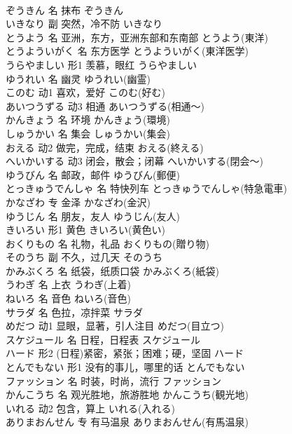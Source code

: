\documentclass[8pt]{extreport}
\begin{document}
\begin{CJK}{UTF8}{min}
\\	ぞうきん	名	抹布	ぞうきん	
\\	いきなり	副	突然，冷不防	いきなり	
\\	とうよう	名	亚洲，东方，亚洲东部和东南部	とうよう(東洋)	
\\	とうよういがく	名	东方医学	とうよういがく(東洋医学)	
\\	うらやましい	形1	羡慕，眼红	うらやましい	
\\	ゆうれい	名	幽灵	ゆうれい(幽霊)	
\\	このむ	动1	喜欢，爱好	このむ(好む)	
\\	あいつうずる	动3	相通	あいつうずる(相通～)	
\\	かんきょう	名	环境	かんきょう(環境)	
\\	しゅうかい	名	集会	しゅうかい(集会)	
\\	おえる	动2	做完，完成，结束	おえる(終える)	
\\	へいかいする	动3	闭会，散会；闭幕	へいかいする(閉会～)	
\\	ゆうびん	名	邮政，邮件	ゆうびん(郵便)	
\\	とっきゅうでんしゃ	名	特快列车	とっきゅうでんしゃ(特急電車)	
\\	かなざわ	专	金泽	かなざわ(金沢)	
\\	ゆうじん	名	朋友，友人	ゆうじん(友人)	
\\	きいろい	形1	黄色	きいろい(黄色い)	
\\	おくりもの	名	礼物，礼品	おくりもの(贈り物)	
\\	そのうち	副	不久，过几天	そのうち	
\\	かみぶくろ	名	纸袋，纸质口袋	かみぶくろ(紙袋)	
\\	うわぎ	名	上衣	うわぎ(上着)	
\\	ねいろ	名	音色	ねいろ(音色)	
\\	サラダ	名	色拉，凉拌菜	サラダ	
\\	めだつ	动1	显眼，显著，引人注目	めだつ(目立つ)	
\\	スケジュール	名	日程，日程表	スケジュール	
\\	ハード	形2	(日程)紧密，紧张；困难；硬，坚固	ハード	
\\	とんでもない	形1	没有的事儿，哪里的话	とんでもない	
\\	ファッション	名	时装，时尚，流行	ファッション	
\\	かんこうち	名	观光胜地，旅游胜地	かんこうち(観光地)	
\\	いれる	动2	包含，算上	いれる(入れる)	
\\	ありまおんせん	专	有马温泉	ありまおんせん(有馬温泉)	

\end{CJK}
\end{document}
